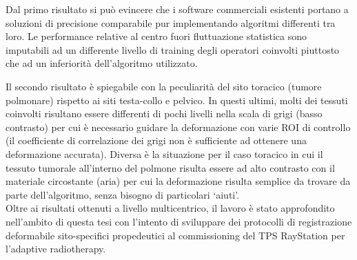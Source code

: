 
Dal primo risultato si può evincere che i software commerciali esistenti portano a soluzioni di precisione comparabile pur implementando algoritmi differenti tra loro. Le performance relative al centro fuori fluttuazione statistica sono imputabili ad un differente livello di training degli operatori coinvolti piuttosto che ad un inferiorità dell'algoritmo utilizzato.

Il secondo risultato è spiegabile con la peculiarità del sito toracico (tumore polmonare) rispetto ai siti testa-collo e pelvico. In questi ultimi, molti dei tessuti coinvolti risultano essere differenti di pochi livelli nella scala di grigi (basso contrasto) per cui è necessario guidare la deformazione con varie ROI di controllo (il coefficiente di correlazione dei grigi non è sufficiente ad ottenere una deformazione accurata). Diversa è la situazione per il caso toracico in cui il tessuto tumorale all'interno del polmone risulta essere ad alto contrasto con il materiale circostante (aria) per cui la deformazione risulta semplice da trovare da parte dell'algoritmo, senza bisogno di particolari `aiuti'.\\

Oltre ai risultati ottenuti a livello multicentrico, il lavoro è stato approfondito nell'ambito di questa tesi con l'intento di sviluppare dei protocolli di registrazione deformabile sito-specifici propedeutici al commissioning del TPS RayStation per l'adaptive radiotherapy. 

